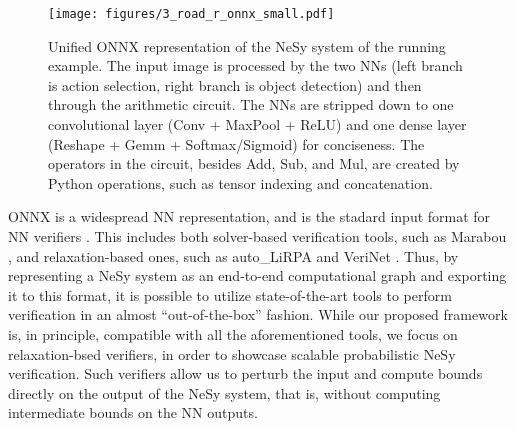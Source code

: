 \begin{figure}[!h]
    \centering
    \texttt{[image: figures/3\_road\_r\_onnx\_small.pdf]}
    \caption{Unified ONNX representation of the NeSy system of the running example. The input image is processed by the two NNs (left branch is action selection, right branch is object detection) and then through the arithmetic circuit. The NNs are stripped down to one convolutional layer (Conv + MaxPool + ReLU) and one dense layer (Reshape + Gemm + Softmax/Sigmoid) for conciseness. The operators in the circuit, besides Add, Sub, and Mul, are created by Python operations, such as tensor indexing and concatenation.}
    \vspace{0.1cm}
    \label{fig:onnx}
\end{figure}

ONNX is a widespread NN representation, and is the stadard input format for NN verifiers \cite{vnnlib2024}. This includes both solver-based verification tools, such as Marabou \cite{katz2019marabou}, and relaxation-based ones, such as auto\_LiRPA \cite{autolirpaXu2020} and VeriNet \cite{henriksen2020efficient}. Thus, by representing a NeSy system as an end-to-end computational graph and exporting it to this format, it is possible to utilize state-of-the-art tools to perform verification in an almost ``out-of-the-box'' fashion. While our proposed framework is, in principle, compatible with all the aforementioned tools, we focus on relaxation-bsed verifiers, in order to showcase scalable probabilistic NeSy verification. Such verifiers allow us to perturb the input and compute bounds directly on the output of the NeSy system, that is, without computing intermediate bounds on the NN outputs.
